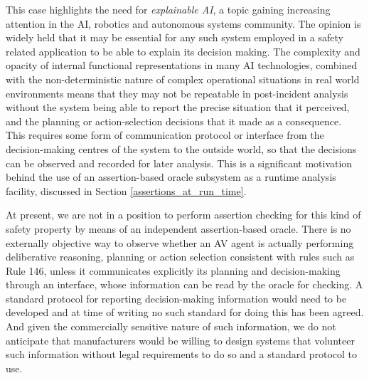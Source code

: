 This case highlights the need for \emph{explainable AI}, a topic gaining increasing attention in the AI, robotics and autonomous systems community. The opinion is widely held \cite{deeks2019judicial, o2019legal, wortham2020transparency} that it may be essential for any such system employed in a safety related application to be able to explain its decision making. The complexity and opacity of internal functional representations in many AI technologies, combined with the non-deterministic nature of complex operational situations in real world environments means that they may not be repeatable in post-incident analysis without the system being able to report the precise situation that it perceived, and the planning or action-selection decisions that it made as a consequence. This requires some form of communication protocol or interface from the decision-making centres of the system to the outside world, so that the decisions can be observed and recorded for later analysis. This is a significant motivation behind the use of an assertion-based oracle subsystem as a runtime analysis facility, discussed in Section \ref{assertions_at_run_time}.

At present, we are not in a position to perform assertion checking for this kind of safety property by means of an independent assertion-based oracle. There is no externally objective way to observe whether an AV agent is actually performing deliberative reasoning, planning or action selection consistent with rules such as Rule 146, unless it communicates explicitly its planning and decision-making through an interface, whose information can be read by the oracle for checking. A standard protocol for reporting decision-making information would need to be developed and at time of writing no such standard for doing this has been agreed. And given the commercially sensitive nature of such information, we do not anticipate that manufacturers would be willing to design systems that volunteer such information without legal requirements to do so and a standard protocol to use.

